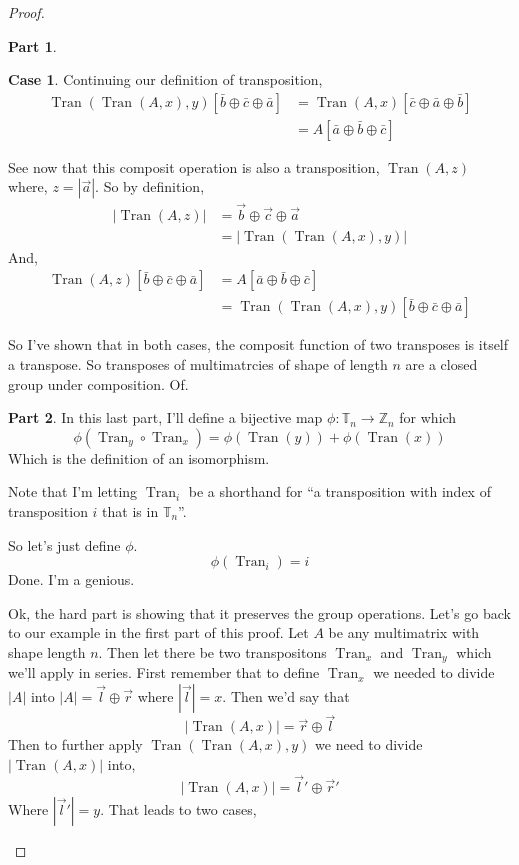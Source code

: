 \documentclass[12pt]{book}
\theoremstyle{plain}
\theoremstyle{definition}
\theoremstyle{ppart}
\newtheorem{ppart}{Part}
\theoremstyle{case}
\newtheorem{case}{Case}
\theoremstyle{solution}
\DeclareMathOperator{\Tran}{Tran}
\begin{document}
\begin{proof}
\begin{ppart}
\begin{case}
Continuing our definition of transposition,
\begin{align*}
  \Tran(\Tran(A, x), y)[\bar{b} \oplus \bar{c} \oplus \bar{a}]
  &=
  \Tran(A, x)[\bar{c} \oplus \bar{a} \oplus \bar{b}] \\
  &=
  A[\bar{a} \oplus \bar{b} \oplus \bar{c}]
\end{align*}

See now that this composit operation is also a transposition, $\Tran(A, z)$ where,
$z = |\vec{a}|$.
So by definition,
\begin{align*}
  |\Tran(A, z)|
  &=
  \vec{b} \oplus \vec{c} \oplus \vec{a} \\
  &=
  |\Tran(\Tran(A, x), y)|  
\end{align*}
And,
\begin{align*}
  \Tran(A, z)[\bar{b} \oplus \bar{c} \oplus \bar{a}]
  &=
  A[\bar{a} \oplus \bar{b} \oplus \bar{c}] \\
  &=
  \Tran(\Tran(A, x), y)[\bar{b} \oplus \bar{c} \oplus \bar{a}]
\end{align*}
\end{case}

So I've shown that in both cases, the composit function of two transposes is
itself a transpose. So transposes of multimatrcies of shape of length $n$ are
a closed group under composition. Of.
\end{ppart}

\begin{ppart}
In this last part, I'll define a bijective map
$\phi: \mathbb{T}_n \to \mathbb{Z}_n$ for which
\[ \phi(\Tran_y \circ \Tran_x) = \phi(\Tran(y)) + \phi(\Tran(x)) \]
Which is the definition of an isomorphism.

Note that I'm letting $\Tran_i$ be a shorthand for ``a transposition
with index of transposition $i$ that is in $\mathbb{T}_n$''.

So let's just define $\phi$.
\[ \phi(\Tran_i) = i \]
Done. I'm a genious.

Ok, the hard part is showing that it preserves the group operations.
Let's go back to our example in the first part of this proof. Let $A$ be
any multimatrix with shape length $n$. Then let there be two transpositons
$\Tran_x$ and $\Tran_y$ which we'll apply in series. First remember that
to define $\Tran_x$ we needed to divide $|A|$ into $|A| = \vec{l} \oplus \vec{r}$
where $|\vec{l}| = x$. Then we'd say that
\[ |\Tran(A, x)| = \vec{r} \oplus \vec{l} \]
Then to further apply $\Tran(\Tran(A, x), y)$ we need to divide $|\Tran(A,x)|$
into,
\[ |\Tran(A, x)| = \vec{l}' \oplus \vec{r}' \]
Where $|\vec{l}'| = y$.
That leads to two cases,


\end{ppart}
\end{proof}
\end{document}
